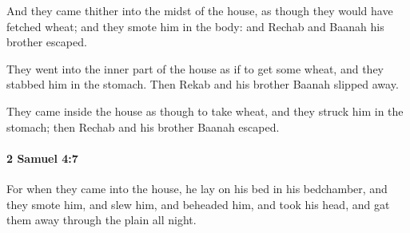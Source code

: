 			\begin{versebox}
					\item[BHS] 
					\item[ASV] And they came thither into the midst of the house, as though they would have fetched wheat; and they smote him in the body: and Rechab and Baanah his brother escaped.
					\item[NIV] They went into the inner part of the house as if to get some wheat, and they stabbed him in the stomach. Then Rekab and his brother Baanah slipped away.
					\item[NRSV] They came inside the house as though to take wheat, and they struck him in the stomach; then Rechab and his brother Baanah escaped.
			\end{versebox}

		\paragraph{2 Samuel 4:7} %
			\label{2SAMUEL-4-7}

			For when they came into the house, he lay on his bed in his bedchamber, and they smote him, and slew him, and beheaded him, and took his head, and gat them away through the plain all night.

